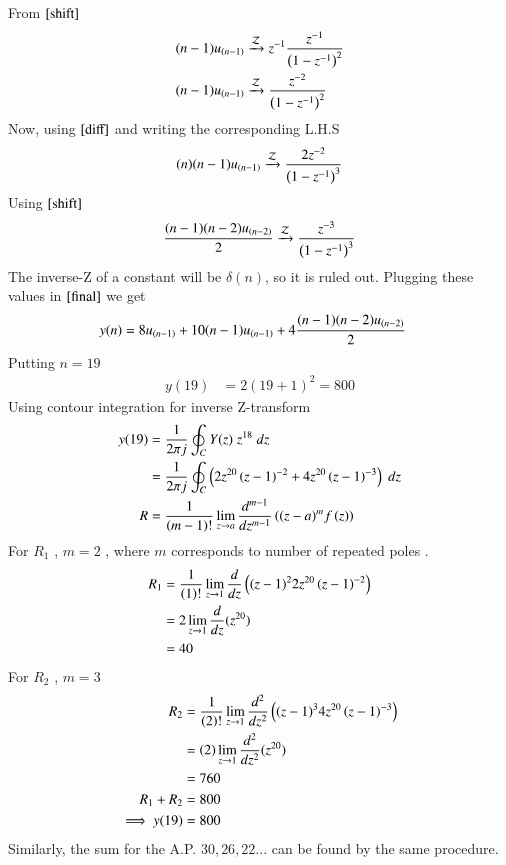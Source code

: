 \documentclass[journal,12pt,onecolumn]{IEEEtran}
\theoremstyle{remark}
\begin{document}
From $\eqref{shift}$
\begin{align}
(n-1)u_{\left(n-1\right)}    &\xrightarrow{\mathcal{Z}} z^{-1}\frac{z^{-1}}{\left(1-z^{-1}\right)^{2}}\\
(n-1)u_{\left(n-1\right)}    &\xrightarrow{\mathcal{Z}} \frac{z^{-2}}{\left(1-z^{-1}\right)^{2}}
\end{align}
Now, using $\eqref{diff}$ and writing the corresponding L.H.S
\begin{align}   
(n)(n-1)u_{\left(n-1\right)}    &\xrightarrow{\mathcal{Z}} \frac{2z^{-2}}{\left(1-z^{-1}\right)^3} \\
\end{align}
Using $\eqref{shift}$
\begin{align}
    \frac{(n-1)(n-2)u_{\left(n-2\right)}}{2}    &\xrightarrow{\mathcal{Z}} \frac{z^{-3}}{\left(1-z^{-1}\right)^3} \\
\end{align}
The inverse-Z of a constant will be $\delta(n)$, so it is ruled out.
Plugging these values in $\eqref{final}$ we get
\begin{align}
   y(n) &= 8u_{\left(n-1\right)} + 10(n-1)u_{\left(n-1\right)} + 4\frac{(n-1)(n-2)u_{\left(n-2\right)}}{2}
\end{align}
Putting $n=19$
\begin{align}
      y(19) &= 2(19+1)^2 = 800
\end{align}
Using contour integration for inverse Z-transform
\begin{align}
    y(19)&=\frac{1}{2\pi j}\oint_{C}Y(z) \;z^{18} \;dz\\  
 &=\frac{1}{2\pi j}\oint_{C}\left(2z^{20}\left(z-1\right)^{-2}+
       4z^{20}\left(z-1\right)^{-3}\right) \;dz\\
       R&=\frac{1}{\left(m-1\right)!}\lim\limits_{z\to a}\frac{d^{m-1}}{dz^{m-1}}\left({(z-a)}^{m}f\left(z\right)\right)\label{eq:6}  
\end{align}
For $R_1$ , $m=2$ , where $m$ corresponds to number of repeated poles .
\begin{align}
    R_1 &=\frac{1}{\left(1\right)!}\lim\limits_{z\to 1}\frac{d}{dz}\left({(z-1)}^{2}2z^{20}\left(z-1\right)^{-2}\right)   \\
    &=2\lim\limits_{z\to 1}\frac{d}{dz}(z^{20})   \\
    &= 40
    \end{align}
    For $R_2$ , $m=3$ 
    \begin{align}
    R_2 &=\frac{1}{\left(2\right)!}\lim\limits_{z\to 1}\frac{d^{2}}{dz^{2}}\left({(z-1)}^{3}4z^{20}\left(z-1\right)^{-3}\right)   \\
    &=\left(2\right)\lim\limits_{z\to 1}\frac{d^2}{dz^2}(z^{20})   \\
    &= 760\\
    R_1 + R_2 &= 800\\
    \implies  y{(19)} &= 800
\end{align}
Similarly, the sum for the A.P. $30,26,22...$ can be found by the same procedure.
\end{document}
